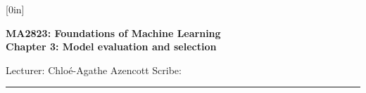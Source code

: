\documentclass[a4paper,12pt]{article}
\begin{document}
\raisebox{0.6in}[0in]{}
\vspace{-0.7in}

\begin{center}
\bf\large MA2823: Foundations of Machine Learning \\
Chapter 3: Model evaluation and selection
\end{center}

\noindent
Lecturer: Chlo\'e-Agathe Azencott   
\hfill
Scribe: 

\noindent
\rule{\textwidth}{1pt}

\medskip

\end{document}
